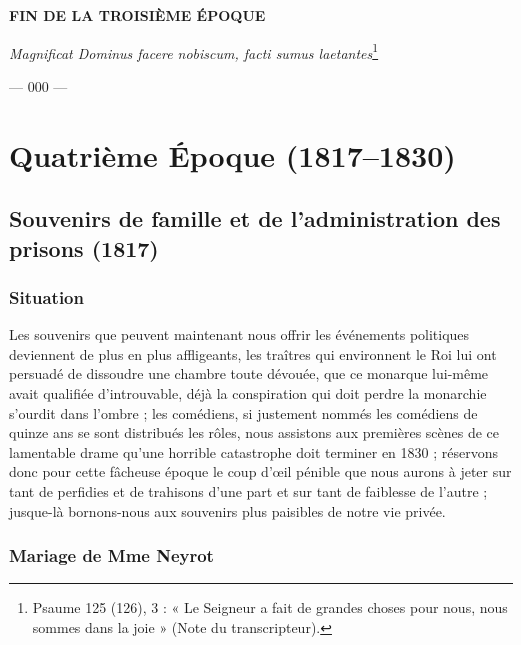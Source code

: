 \documentclass[11pt,a4paper]{report}
\begin{document}
\vspace{1cm}

\begin{center}
\textbf{FIN DE LA TROISIÈME ÉPOQUE}

\vspace{0.5cm}

\textit{Magnificat Dominus facere nobiscum, facti sumus laetantes}\footnote{Psaume 125 (126), 3 : « Le Seigneur a fait de grandes choses pour nous, nous sommes dans la joie » (Note du transcripteur).}

\vspace{0.5cm}

--- 000 ---
\end{center}


\part*{Quatrième Époque (1817--1830)}

\chapter{Souvenirs de famille et de l'administration des prisons (1817)}

\section*{Situation}

Les souvenirs que peuvent maintenant nous offrir les événements politiques deviennent de plus en plus affligeants, les traîtres qui environnent le Roi lui ont persuadé de dissoudre une chambre toute dévouée, que ce monarque lui-même avait qualifiée d'introuvable, déjà la conspiration qui doit perdre la monarchie s'ourdit dans l'ombre ; les comédiens, si justement nommés les comédiens de quinze ans se sont distribués les rôles, nous assistons aux premières scènes de ce lamentable drame qu'une horrible catastrophe doit terminer en 1830 ; réservons donc pour cette fâcheuse époque le coup d'œil pénible que nous aurons à jeter sur tant de perfidies et de trahisons d'une part et sur tant de faiblesse de l'autre ; jusque-là bornons-nous aux souvenirs plus paisibles de notre vie privée.

\section*{Mariage de Mme Neyrot}
\end{document}
